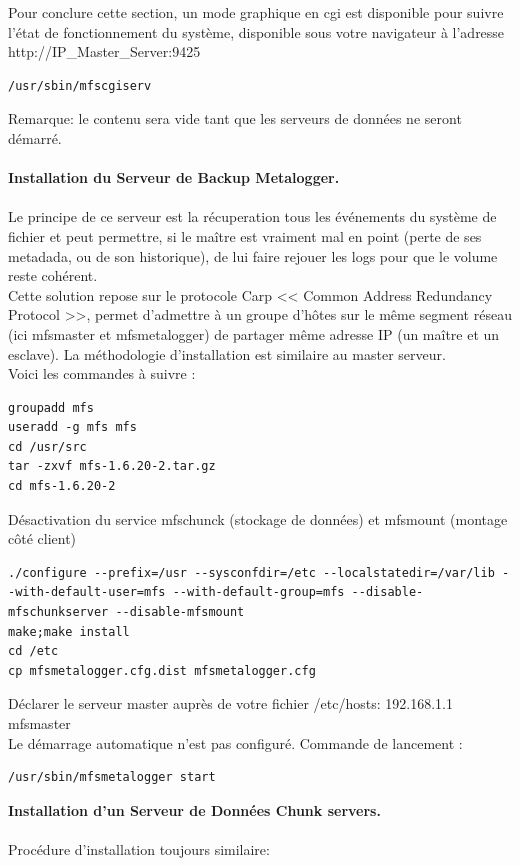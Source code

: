 \documentclass[12pt]{report}
\begin{document}
Pour conclure cette section, un mode graphique en cgi est disponible pour suivre l'état de fonctionnement du système, disponible sous votre navigateur à l'adresse http://IP\_Master\_Server:9425
  \begin{lstlisting}
/usr/sbin/mfscgiserv
	  \end{lstlisting}
Remarque: le contenu sera vide tant que les serveurs de données ne seront démarré.\\\\
\textbf{Installation du Serveur de Backup Metalogger.}\\\\
Le principe de ce serveur est la récuperation tous les événements du système de fichier et peut permettre, si le maître est vraiment mal en point (perte de ses metadada, ou de son historique), de lui faire rejouer les logs pour que le volume reste cohérent.\\
Cette solution repose sur le protocole Carp << Common Address Redundancy Protocol >>, permet d'admettre à un groupe d'hôtes sur le même segment réseau (ici mfsmaster et mfsmetalogger) de partager même adresse IP (un maître et un esclave). 
La méthodologie d'installation est similaire au master serveur.\\
Voici les commandes à suivre :\\
  \begin{lstlisting}
groupadd mfs
useradd -g mfs mfs
cd /usr/src
tar -zxvf mfs-1.6.20-2.tar.gz
cd mfs-1.6.20-2
	  \end{lstlisting}
Désactivation du service mfschunck (stockage de données) et mfsmount (montage côté client)
  \begin{lstlisting}
./configure --prefix=/usr --sysconfdir=/etc --localstatedir=/var/lib --with-default-user=mfs --with-default-group=mfs --disable-mfschunkserver --disable-mfsmount
make;make install
cd /etc
cp mfsmetalogger.cfg.dist mfsmetalogger.cfg
	  \end{lstlisting}
Déclarer le serveur master auprès de votre fichier /etc/hosts: 192.168.1.1  mfsmaster\\
Le démarrage automatique n'est pas configuré. Commande de lancement :
  \begin{lstlisting}
/usr/sbin/mfsmetalogger start
	  \end{lstlisting}
\textbf{Installation d'un Serveur de Données Chunk servers.}\\\\
Procédure d'installation toujours similaire:\\
\end{document}
